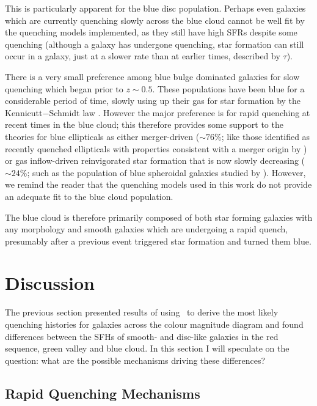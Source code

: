 This is particularly apparent for the blue disc population. Perhaps even galaxies which are currently quenching slowly across the blue cloud cannot be well fit by the quenching models implemented, as they still have high SFRs despite some quenching (although a galaxy has undergone quenching, star formation can still occur in a galaxy, just at a slower rate than at earlier times, described by $\tau$).


There is a very small preference among blue bulge dominated galaxies for slow quenching which began prior to $z \sim 0.5 $. These populations have been blue for a considerable period of time, slowly using up their gas for star formation by the Kennicutt$-$Schmidt law \citep{Schmidt59, Kennicutt97}. However the major preference is for rapid quenching at recent times in the blue cloud; this therefore provides some support to the theories for blue ellipticals as either merger-driven ($\sim76\%$; like those identified as recently quenched ellipticals with properties consistent with a merger origin by \citealt{McIntosh14}) or gas inflow-driven reinvigorated star formation that is now slowly decreasing ($\sim24\%$; such as the population of blue spheroidal galaxies studied by \citealt{Kaviraj13}). However, we remind the reader that the quenching models used in this work do not provide an adequate fit to the blue cloud population.

The blue cloud is therefore primarily composed of both star forming galaxies with any morphology and smooth galaxies which are undergoing a rapid quench, presumably after a previous event triggered star formation and turned them blue.


\section{Discussion}\label{morph:discussion}

The previous section presented results of using \starpy ~to derive the most likely quenching histories for galaxies across the colour magnitude diagram and found differences between the SFHs of smooth- and disc-like galaxies in the red sequence, green valley and blue cloud. In this section I will speculate on the question: what are the possible mechanisms driving these differences? 

\subsection{Rapid Quenching Mechanisms}\label{rapid}

